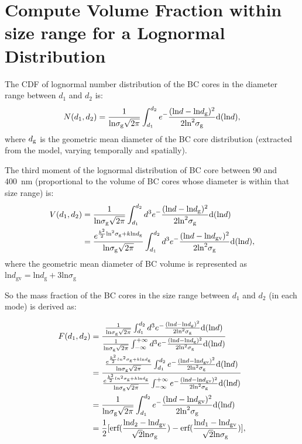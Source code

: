 \documentclass[11pt]{article}
\begin{document}
	\section{Compute Volume Fraction within size range for a Lognormal Distribution}
	The CDF of lognormal number distribution of the BC cores in the diameter range between $d_{1}$ and
	$d_{2}$ is:
	\begin{align*}
	N(d_{1}, d_{2}) = \frac{1}{\text{ln}\sigma_{\text{g}}\sqrt{2\pi}}\int_{d_{1}}^{d_{2}}e^-\frac{(\text{ln}d - \text{ln}d_{\rm g})^2}{2\text{ln}^2\sigma_{\text{g}}}\text{d}(\text{ln}d),
	\end{align*}
	where $d_{\rm g}$ is the geometric mean diameter of the BC core distribution (extracted from the model, varying temporally and spatially). 
	
	The third moment of the lognormal distribution of BC core between 90 and 400~nm (proportional to the volume of BC cores whose diameter is within that size range) is:
	\begin{align*}
	V(d_{1}, d_{2}) &= \frac{1}{\text{ln}\sigma_{\text{g}}\sqrt{2\pi}}\int_{d_{1}}^{d_{2}}d^3e^-\frac{(\text{ln}d - \text{ln}d_{\rm g})^2}{2\text{ln}^2\sigma_{\text{g}}}\text{d}(\text{ln}d)  \\
	&=\frac{e^{\frac{k^2}{2}\text{ln}^2\sigma_{\rm g}+k\text{ln}d_{\rm g}}}{\text{ln}\sigma_{\text{g}}\sqrt{2\pi}}\int_{d_{1}}^{d_{2}}d^3e^-\frac{(\text{ln}d - \text{ln}d_{\text{gv}})^2}{2\text{ln}^2\sigma_{\text{g}}}\text{d}(\text{ln}d),
	\end{align*}
	where the geometric mean diameter of BC volume is represented as $\text{ln}d_{\text{gv}}
	= \text{ln}d_{\text{g}} + 3\text{ln}\sigma_{\text{g}}$
	
	So the mass fraction of the BC cores in the size range between $d_{1}$ and $d_{2}$ (in each mode) is derived as:
	
	\begin{align*}
	F(d_{1}, d_{2}) &= \frac{\frac{1}{\text{ln}\sigma_{\text{g}}\sqrt{2\pi}}\int_{d_{1}}^{d_{2}}d^3e^-\frac{(\text{ln}d - \text{ln}d_{\rm g})^2}{2\text{ln}^2\sigma_{\text{g}}}\text{d}(\text{ln}d)}
	{\frac{1}{\text{ln}\sigma_{\text{g}}\sqrt{2\pi}}\int_{-\infty}^{+\infty}d^3e^-\frac{(\text{ln}d - \text{ln}d_{\rm g})^2}{2\text{ln}^2\sigma_{\text{g}}}\text{d}(\text{ln}d)}  \\
	&=\frac{\frac{e^{\frac{k^2}{2}ln^2\sigma_{\rm g}+k\text{ln}d_{\rm g}}}{\text{ln}\sigma_{\text{g}}\sqrt{2\pi}}\int_{d_{1}}^{d_{2}}e^-\frac{(\text{ln}d - \text{ln}d_{\text{gv}})^2}{2\text{ln}^2\sigma_{\text{g}}}\text{d}(\text{ln}d)}{\frac{e^{\frac{k^2}{2}ln^2\sigma_{\rm g}+k\text{ln}d_{\rm g}}}{\text{ln}\sigma_{\text{g}}\sqrt{2\pi}}\int_{-\infty}^{+\infty}e^-\frac{(\text{ln}d - \text{ln}d_{\text{gv}})^2}{2\text{ln}^2\sigma_{\text{g}}}\text{d}(\text{ln}d)}\\
	&=\frac{1}{\text{ln}\sigma_{\text{g}}\sqrt{2\pi}}\int_{d_{1}}^{d_{2}}e^-\frac{(\text{ln}d - \text{ln}d_{\text{gv}})^2}{2\text{ln}^2\sigma_{\text{g}}}\text{d}(\text{ln}d) \\
	&=\frac{1}{2}[\text{erf}(\frac{\text{ln}d_{2} - \text{ln}d_{\text{gv}}}{\sqrt{2}\text{ln}\sigma_{\rm g}})-\text{erf}(\frac{\text{ln}d_{1} - \text{ln}d_{\text{gv}}}{\sqrt{2}\text{ln}\sigma_{\rm g}})],
	\end{align*}
	
\end{document}
